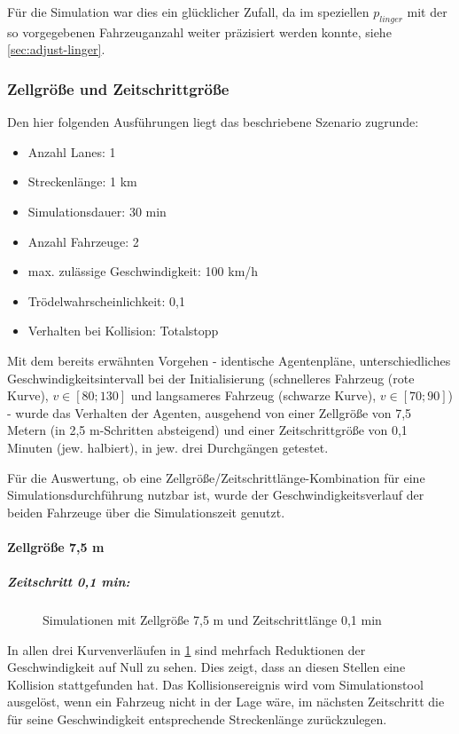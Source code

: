Für die Simulation war dies ein glücklicher Zufall, da im speziellen $p_{linger}$ mit der so vorgegebenen Fahrzeuganzahl weiter präzisiert werden konnte, siehe \cref{sec:adjust-linger}.




\subsubsection{Zellgröße und Zeitschrittgröße}
\label{sec:cellsize-timesteplength}

Den hier folgenden Ausführungen liegt das beschriebene Szenario zugrunde:
\begin{itemize}
\itemsep0em
	\item Anzahl Lanes: 1
	\item Streckenlänge: 1 km
	\item Simulationsdauer: 30 min
	\item Anzahl Fahrzeuge: 2
	\item max. zulässige Geschwindigkeit: 100 km/h
	\item Trödelwahrscheinlichkeit: 0,1
	\item Verhalten bei Kollision: Totalstopp
\end{itemize}
Mit dem bereits erwähnten Vorgehen - identische Agentenpläne, unterschiedliches Geschwindigkeitsintervall bei der Initialisierung (schnelleres Fahrzeug (rote Kurve), $ v \in [80; 130] $ und langsameres Fahrzeug (schwarze Kurve), $ v \in [70; 90] $) - wurde das Verhalten der Agenten, ausgehend von einer Zellgröße von 7,5 Metern (in 2,5 m-Schritten absteigend) und einer Zeitschrittgröße von 0,1 Minuten (jew. halbiert), in jew. drei Durchgängen getestet.

Für die Auswertung, ob eine Zellgröße/Zeitschrittlänge-Kombination für eine Simulationsdurchführung nutzbar ist, wurde der Geschwindigkeitsverlauf der beiden Fahrzeuge über die Simulationszeit genutzt.


\paragraph*{Zellgröße 7,5 m} \hfill
\subparagraph*{Zeitschritt 0,1 min:}
\begin{figure}[hptb]
  \centering 
   \qquad 
   \qquad 
  \caption{Simulationen mit Zellgröße 7,5 m und Zeitschrittlänge 0,1 min} 
  \label{figure:run1-3}
\end{figure}
In allen drei Kurvenverläufen in \cref{figure:run1-3} sind mehrfach Reduktionen der Geschwindigkeit auf Null zu sehen. 
Dies zeigt, dass an diesen Stellen eine Kollision stattgefunden hat. Das Kollisionsereignis wird vom Simulationstool ausgelöst, wenn ein Fahrzeug nicht in der Lage wäre, im nächsten Zeitschritt die für seine Geschwindigkeit entsprechende Streckenlänge zurückzulegen.

